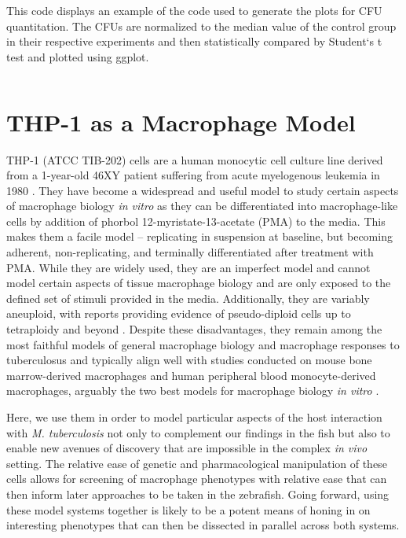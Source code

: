 \begin{code}
\caption{This code displays an example of the code used to generate the plots for CFU quantitation. The CFUs are normalized to the median value of the control group in their respective experiments and then statistically compared by Student`s t test and plotted using ggplot.}
\label{cfuanalysis}

\inputminted[breaklines,frame=single,fontsize=\small]{r}{source/cfu_plot_example.R}

\end{code}

\section{THP\hyp{}1 as a Macrophage Model}\label{thp1}

THP\hyp{}1 (ATCC TIB\hyp{}202) cells are a human monocytic cell culture line derived from a 1\hyp{}year\hyp{}old 46XY patient suffering from acute myelogenous leukemia in 1980 \citep{Tsuchiya1980}. They have become a widespread and useful model to study certain aspects of macrophage biology \textit{in vitro} as they can be differentiated into macrophage\hyp{}like cells by addition of phorbol 12\hyp{}myristate\hyp{}13\hyp{}acetate (PMA) to the media. This makes them a facile model -- replicating in suspension at baseline, but becoming adherent, non\hyp{}replicating, and terminally differentiated after treatment with PMA. While they are widely used, they are an imperfect model and cannot model certain aspects of tissue macrophage biology and are only exposed to the defined set of stimuli provided in the media. Additionally, they are variably aneuploid, with reports providing evidence of pseudo\hyp{}diploid cells up to tetraploidy and beyond \citep{Odero2000, Adati2009, Kasai2022}. Despite these disadvantages, they remain among the most faithful models of general macrophage biology and macrophage responses to tuberculosus and typically align well with studies conducted on mouse bone marrow\hyp{}derived macrophages and human peripheral blood monocyte\hyp{}derived macrophages, arguably the two best models for macrophage biology \textit{in vitro} \citep{MendozaCoronel2016}. 

Here, we use them in order to model particular aspects of the host interaction with \textit{M. tuberculosis} not only to complement our findings in the fish but also to enable new avenues of discovery that are impossible in the complex \textit{in vivo} setting. The relative ease of genetic and pharmacological manipulation of these cells allows for screening of macrophage phenotypes with relative ease that can then inform later approaches to be taken in the zebrafish. Going forward, using these model systems together is likely to be a potent means of honing in on interesting phenotypes that can then be dissected in parallel across both systems. 

